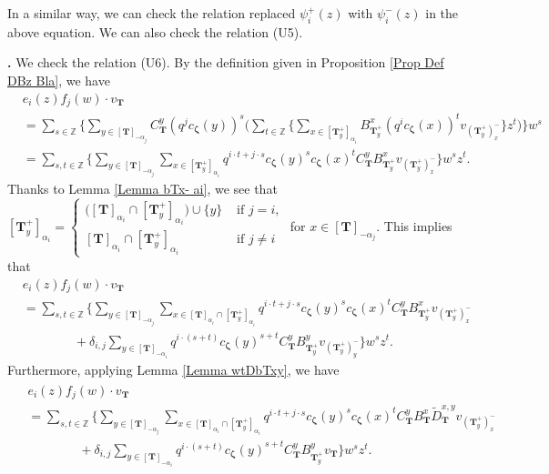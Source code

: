 \documentclass[12pt]{amsart}
\def \para{\refstepcounter{thm} \par\medskip\noindent
                \textbf{\thethm .} }
\numberwithin{equation}{thm}
\newcommand\ZZ{\mathbb Z}
\newcommand\bT{\mathbf T}
\renewcommand\a{\alpha}  %
\renewcommand\d{\delta}  %
\newcommand\Bz{\boldsymbol\zeta}
\newcommand\wt{\widetilde}
\newcounter{ni}
\begin{document}
In a similar way, 
we can check the relation replaced $\psi_i^+(z)$ with $\psi_i^-(z)$ in the above equation. We can also check the relation (U5). 

\para 
We check the relation (U6).  
By the definition given in Proposition \ref{Prop Def DBz Bla}, we have  
\begin{align*}
&e_i(z) f_j(w) \cdot v_{\bT} 
\\
&= \sum_{s \in \ZZ} \Big\{ \sum_{y \in [\bT]_{-\a_j}} C_{\bT}^y (q^j c_{\Bz} (y))^s 
	\Big( \sum_{t \in \ZZ} \big\{ \sum_{x \in [\bT_y^+]_{\a_i}} B_{\bT_y^+}^x (q^i c_{\Bz} (x))^t v_{(\bT_y^+)_x^-} \big\} z^t \Big) 
	\Big\} w^s 
\\
&= \sum_{s,t \in \ZZ} \Big\{ 
	\sum_{y \in [\bT]_{-\a_j}} \sum_{x \in [\bT_y^+]_{\a_i}} 
		q^{i \cdot t + j \cdot s} c_{\Bz} (y)^s c_{\Bz} (x)^t C_{\bT}^y B_{\bT_y^+}^x  v_{(\bT_y^+)_x^-} \Big\} w^s z^t. 
\end{align*}
Thanks to Lemma \ref{Lemma bTx- ai}, 
we see that $[\bT_y^+]_{\a_i} = 
	\begin{cases} 
		\big( [\bT]_{\a_i} \cap [\bT_y^+]_{\a_i} \big) \cup \{y\} & \text{ if } j=i, 
		\\
		[\bT]_{\a_i} \cap [\bT_y^+]_{\a_i} & \text{ if } j \not=i
	\end{cases} $
for $x \in [\bT]_{-\a_j}$. 
This implies that 
\begin{align*}
&e_i(z) f_j(w) \cdot v_{\bT}
\\
&= \sum_{s, t \in \ZZ} \Big\{ \sum_{y \in [\bT]_{-\a_j}} \sum_{x \in [\bT]_{\a_i} \cap [\bT_y^+]_{\a_i}} 
		q^{i \cdot t + j \cdot s} c_{\Bz} (y)^s c_{\Bz} (x)^t C_{\bT}^y B_{\bT_y^+}^x  v_{(\bT_y^+)_x^-} 
	\\ & \hspace{4em} 
	+ \d_{i,j} \sum_{ y \in [\bT]_{-\a_i}} q^{i \cdot (s+t) } c_{\Bz} (y)^{s+t} C_{\bT}^y B_{\bT_y^+}^y  v_{(\bT_y^+)_y^-} 
	\Big\} w^s z^t. 
\end{align*}
Furthermore, applying Lemma \ref{Lemma wtDbTxy}, 
we have 
\begin{align}
\label{eiz fjw vbT}
\begin{split}
&e_i(z) f_j(w) \cdot v_{\bT}
\\
&= \sum_{s, t \in \ZZ} \Big\{ \sum_{y \in [\bT]_{-\a_j}} \sum_{x \in [\bT]_{\a_i} \cap [\bT_y^+]_{\a_i}} 
		q^{i \cdot t + j \cdot s} c_{\Bz} (y)^s c_{\Bz} (x)^t C_{\bT}^y B_{\bT}^x \wt{D}_{\bT}^{x,y}  v_{(\bT_y^+)_x^-} 
	\\ & \hspace{4em} 
	+ \d_{i,j} \sum_{ y \in [\bT]_{-\a_i}} q^{i \cdot (s+t) } c_{\Bz} (y)^{s+t} C_{\bT}^y B_{\bT_y^+}^y  v_{\bT} 
	\Big\} w^s z^t. 
\end{split} 
\end{align}
\end{document}
